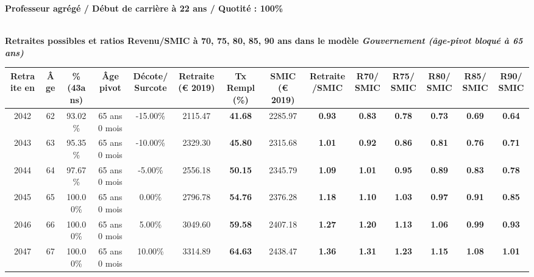 {\bf \noindent Professeur agrégé / Début de carrière à 22 ans / Quotité : 100\%}  ~ 

 ~\\{\bf \noindent Retraites possibles et ratios Revenu/SMIC à 70, 75, 80, 85, 90 ans dans le modèle \emph{Gouvernement (âge-pivot bloqué à 65 ans)}}  
 
\begin{adjustbox}{max width=\textwidth} 
\begin{tabular}[htb]{|c|c||c|c|c||c|c||c|c||c|c|c|c|c|} 
\hline 
 Retraite en &  Âge &  \%(43ans) &  Âge pivot &  Décote/Surcote &  Retraite (\euro{} 2019) &  Tx Rempl(\%) &  SMIC (\euro{} 2019) &  Retraite/SMIC &  R70/SMIC &  R75/SMIC &  R80/SMIC &  R85/SMIC &  R90/SMIC \\ 
\hline \hline 
 2042 &  62 &  93.02\% &  65 ans 0 mois &  -15.00\% &  2115.47 &  {\bf 41.68} &  2285.97 &  {\bf {\color{red} 0.93}} &  {\bf {\color{red} 0.83}} &  {\bf {\color{red} 0.78}} &  {\bf {\color{red} 0.73}} &  {\bf {\color{red} 0.69}} &  {\bf {\color{red} 0.64}} \\ 
\hline 
 2043 &  63 &  95.35\% &  65 ans 0 mois &  -10.00\% &  2329.30 &  {\bf 45.80} &  2315.68 &  {\bf 1.01} &  {\bf {\color{red} 0.92}} &  {\bf {\color{red} 0.86}} &  {\bf {\color{red} 0.81}} &  {\bf {\color{red} 0.76}} &  {\bf {\color{red} 0.71}} \\ 
\hline 
 2044 &  64 &  97.67\% &  65 ans 0 mois &  -5.00\% &  2556.18 &  {\bf 50.15} &  2345.79 &  {\bf 1.09} &  {\bf 1.01} &  {\bf {\color{red} 0.95}} &  {\bf {\color{red} 0.89}} &  {\bf {\color{red} 0.83}} &  {\bf {\color{red} 0.78}} \\ 
\hline 
 2045 &  65 &  100.00\% &  65 ans 0 mois &  0.00\% &  2796.78 &  {\bf 54.76} &  2376.28 &  {\bf 1.18} &  {\bf 1.10} &  {\bf 1.03} &  {\bf {\color{red} 0.97}} &  {\bf {\color{red} 0.91}} &  {\bf {\color{red} 0.85}} \\ 
\hline 
 2046 &  66 &  100.00\% &  65 ans 0 mois &  5.00\% &  3049.60 &  {\bf 59.58} &  2407.18 &  {\bf 1.27} &  {\bf 1.20} &  {\bf 1.13} &  {\bf 1.06} &  {\bf {\color{red} 0.99}} &  {\bf {\color{red} 0.93}} \\ 
\hline 
 2047 &  67 &  100.00\% &  65 ans 0 mois &  10.00\% &  3314.89 &  {\bf 64.63} &  2438.47 &  {\bf 1.36} &  {\bf 1.31} &  {\bf 1.23} &  {\bf 1.15} &  {\bf 1.08} &  {\bf 1.01} \\ 
\hline 
\hline 
\end{tabular} 
\end{adjustbox} 
 
